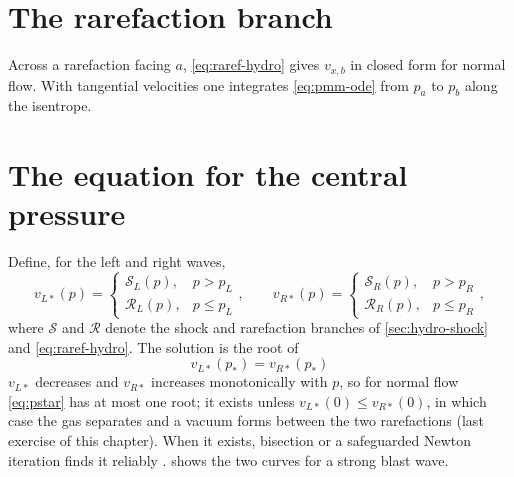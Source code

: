 \documentclass[11pt,a4paper,oneside,openany]{book}
\newcommand{\parencite}{\citep}
\theoremstyle{definition}
\theoremstyle{plain}
\theoremstyle{remark}
\begin{document}
\section{The rarefaction branch}

Across a rarefaction facing $a$, \eqref{eq:raref-hydro} gives $v_{x,b}$ in closed form for
normal flow. With tangential velocities one integrates \eqref{eq:pmm-ode} from $p_a$ to $p_b$
along the isentrope.

\section{The equation for the central pressure}

Define, for the left and right waves,
\begin{equation}
v_{L\ast}(p)=\begin{cases}\mathcal S_L(p),&p>p_L\\ \mathcal R_L(p),&p\le p_L\end{cases},
\qquad
v_{R\ast}(p)=\begin{cases}\mathcal S_R(p),&p>p_R\\ \mathcal R_R(p),&p\le p_R\end{cases},
\end{equation}
where $\mathcal S$ and $\mathcal R$ denote the shock and rarefaction branches of
\cref{sec:hydro-shock} and \eqref{eq:raref-hydro}. The solution is the root of
\begin{equation}\label{eq:pstar}
\boxed{\;v_{L\ast}(p_\ast)=v_{R\ast}(p_\ast)\;}
\end{equation}
$v_{L\ast}$ decreases and $v_{R\ast}$ increases monotonically with $p$, so for normal flow
\eqref{eq:pstar} has at most one root; it exists unless $v_{L\ast}(0)\le v_{R\ast}(0)$, in which
case the gas separates and a vacuum forms between the two rarefactions (last exercise of this
chapter). When it exists, bisection or a safeguarded Newton iteration finds it reliably
\parencite{MartiMuller1994}.  shows the two curves
for a strong blast wave.
\end{document}
